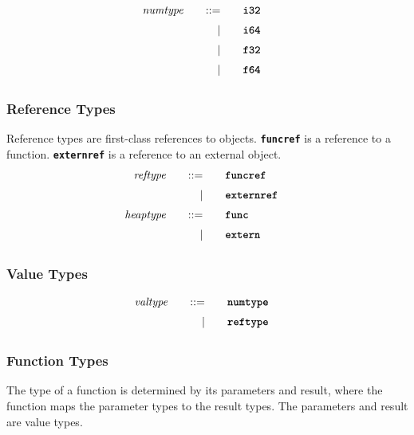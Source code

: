 \begin{alignat*}{9}
    && \textit{numtype}    &&\quad ::= &\quad && \textbf{\texttt{i32}}  \quad && \\[1mm]
    && &&\quad | &\quad && \textbf{\texttt{i64}}  \quad && \\[1mm]
    && &&\quad | &\quad && \textbf{\texttt{f32}}  \quad && \\[1mm]
    && &&\quad | &\quad && \textbf{\texttt{f64}}  \quad && \\[1mm]
\end{alignat*}

\subsubsection{Reference Types}
Reference types are first-class references to objects. 
\textbf{\texttt{funcref}} is a reference to a function. \textbf{\texttt{externref}} is a reference to an external object.
\begin{alignat*}{9}
    && \textit{reftype}    &&\quad ::= &\quad && \textbf{\texttt{funcref}}  \quad && \\[1mm]
    && &&\quad | &\quad && \textbf{\texttt{externref}}  \quad && \\[1mm]
    && \textit{heaptype}    &&\quad ::= &\quad && \textbf{\texttt{func}}  \quad && \\[1mm]
    && &&\quad | &\quad && \textbf{\texttt{extern}}  \quad && \\[1mm]
\end{alignat*}

\subsubsection{Value Types}
\begin{alignat*}{9}
    && \textit{valtype}    &&\quad ::= &\quad && \textbf{\texttt{numtype}}  \quad && \\[1mm]
    &&     &&\quad | &\quad && \textbf{\texttt{reftype}}  \quad && \\[1mm]
\end{alignat*}

\subsubsection{Function Types}
The type of a function is determined by its parameters and result, where the function maps the parameter types to the result types. The parameters and result are value types.

